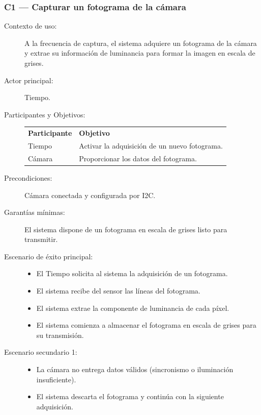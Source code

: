 \documentclass[../main.tex]{subfiles}
\begin{document}
\subsubsection{C1 --- Capturar un fotograma de la cámara}
\begin{description}
    \item[Contexto de uso:] A la frecuencia de captura, el sistema adquiere un fotograma de la cámara y extrae su información de luminancia para formar la imagen en escala de grises.
    \item[Actor principal:] Tiempo.
    \item[Participantes y Objetivos:] \hfill
        
        \begin{tabular}{>{\raggedright\arraybackslash}p{3cm}>{\raggedright\arraybackslash}p{10cm}}
            \rowcolor[HTML]{156082}
            {\color{white}\textbf{Participante}} & {\color{white}\textbf{Objetivo}} \\
            \rowcolor[HTML]{C0E6F5}
            Tiempo & Activar la adquisición de un nuevo fotograma. \\
            Cámara & Proporcionar los datos del fotograma. \\
        \end{tabular}

    \item[Precondiciones:] Cámara conectada y configurada por I2C.
    \item[Garantías mínimas:] El sistema dispone de un fotograma en escala de grises listo para transmitir.
    \item[Escenario de éxito principal:] \hfill
    \begin{itemize}
        \item El Tiempo solicita al sistema la adquisición de un fotograma.
        \item El sistema recibe del sensor las líneas del fotograma.
        \item El sistema extrae la componente de luminancia de cada píxel.
        \item El sistema comienza a almacenar el fotograma en escala de grises para su transmisión.
    \end{itemize}
    \item[Escenario secundario 1:] \hfill
    \begin{itemize}
        \item La cámara no entrega datos válidos (sincronismo o iluminación insuficiente).
        \item El sistema descarta el fotograma y continúa con la siguiente adquisición.
    \end{itemize}
\end{description}
\end{document}

